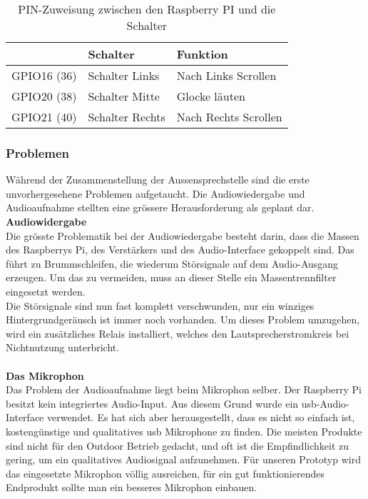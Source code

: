 \begin{table}[]
	\centering
	\label{my-label}
	\begin{tabular}{l|ll}
		\multicolumn{1}{r|}{} \textbf{Pi GPIO (PIN)} & \textbf{Schalter} & \textbf{Funktion} \hspace{60pt}	\\ \hline
		GPIO16 (36)	&	Schalter Links		&	Nach Links Scrollen	\\ \hline
		GPIO20 (38)	&	Schalter Mitte		&	Glocke läuten		\\ \hline
		GPIO21 (40)	&	Schalter Rechts		&	Nach Rechts Scrollen		\\ \hline
	\end{tabular}
	\caption{PIN-Zuweisung zwischen den Raspberry PI und die Schalter}
	\label{tbl:pinroutesdoor}
\end{table}

\subsubsection{Problemen}
Während der Zusammenstellung der Aussensprechstelle sind die erste unvorhergesehene Problemen aufgetaucht. Die Audiowiedergabe und Audioaufnahme stellten eine grössere Herausforderung als geplant dar.
\\
\newpage
\textbf{Audiowidergabe} 
\\
Die grösste Problematik bei der Audiowiedergabe besteht darin, dass die Massen des Raspberrys Pi, des Verstärkers und des Audio-Interface gekoppelt sind. Das führt zu Brummschleifen, die wiederum Störsignale auf dem Audio-Ausgang erzeugen. Um das zu vermeiden, muss an dieser Stelle ein Massentrennfilter eingesetzt werden.
\\
Die Störsignale sind nun fast komplett verschwunden, nur ein winziges Hintergrundgeräusch ist immer noch vorhanden. Um dieses Problem umzugehen, wird ein zusätzliches Relais installiert, welches den Lautsprecherstromkreis bei Nichtnutzung unterbricht.
\\
\\
\textbf{Das Mikrophon}
\\
Das Problem der Audioaufnahme liegt beim Mikrophon selber. Der Raspberry Pi besitzt kein integriertes Audio-Input. Aus diesem Grund wurde ein \gls{usb}-Audio-Interface verwendet. Es hat sich aber herausgestellt, dass es nicht so einfach ist, kostengünstige und qualitatives \gls{usb} Mikrophone zu finden. Die meisten Produkte sind nicht für den Outdoor Betrieb gedacht, und oft ist die Empfindlichkeit zu gering, um ein qualitatives Audiosignal aufzunehmen.  Für unseren Prototyp wird das eingesetzte Mikrophon völlig ausreichen, für ein gut funktionierendes Endprodukt sollte man ein besseres Mikrophon einbauen.
\newpage
